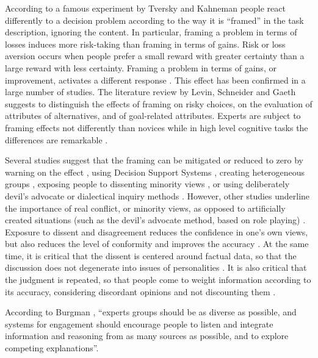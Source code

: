 \documentclass[]{book}
\theoremstyle{definition}
\theoremstyle{definition}
\theoremstyle{definition}
\theoremstyle{remark}
\begin{document}
According to a famous experiment by Tversky and Kahneman
\citep{tversky1981framing} people react differently to a decision
problem according to the way it is ``framed'' in the task description,
ignoring the content. In particular, framing a problem in terms of
losses induces more risk-taking than framing in terms of gains. Risk or
loss aversion occurs when people prefer a small reward with greater
certainty than a large reward with less certainty. Framing a problem in
terms of gains, or improvement, activates a different response
\citep{tversky1981framing}. This effect has been confirmed in a large
number of studies. The literature review by Levin, Schneider and Gaeth
\citep{levin1998all} suggests to distinguish the effects of framing on
risky choices, on the evaluation of attributes of alternatives, and of
goal-related attributes. Experts are subject to framing effects not
differently than novices \citep{loke1992effects} while in high level
cognitive tasks the differences are remarkable \citep{larkin1980expert}.

Several studies suggest that the framing can be mitigated or reduced to
zero by warning on the effect \citep{cheng2010debiasing}, using Decision
Support Systems \citep{bhandari2008debiasing}, creating heterogeneous
groups \citep{yaniv2011group}, exposing people to dissenting minority
views \citep{nemeth1988modelling}, or using deliberately devil's
advocate or dialectical inquiry methods \citep{lord1984considering}.
However, other studies underline the importance of real conflict, or
minority views, as opposed to artificially created situations (such as
the devil's advocate method, based on role playing)
\citep{goodwin2010limits}. Exposure to dissent and disagreement reduces
the confidence in one's own views, but also reduces the level of
conformity and improves the accuracy \citep{nemeth2001devil}. At the
same time, it is critical that the dissent is centered around factual
data, so that the discussion does not degenerate into issues of
personalities \citep{keay2012authorising}. It is also critical that the
judgment is repeated, so that people come to weight information
according to its accuracy, considering discordant opinions and not
discounting them \citep{harries2004combining}.

According to Burgman \citep{burgman2015trusting}, ``experts groups
should be as diverse as possible, and systems for engagement should
encourage people to listen and integrate information and reasoning from
as many sources as possible, and to explore competing explanations''.
\end{document}
